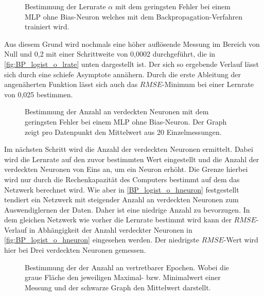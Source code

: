 \begin{figure}[!htb]
    \centering
        
    \caption{Bestimmung der Lernrate $\alpha$ mit dem geringsten Fehler bei einem MLP ohne Bias-Neuron welches mit dem Backpropagation-Verfahren trainiert wird.  }
    \label{fig:BP_logist_o_lrate}
\end{figure}

Aus diesem Grund wird nochmals eine höher auflösende Messung im Bereich von Null und 0,2 mit einer Schrittweite von 0,0002 durchgeführt, die in \autoref{fig:BP_logist_o_lrate} unten dargestellt ist. Der sich so ergebende Verlauf lässt sich durch eine schiefe Asymptote annähern. Durch die erste Ableitung der angenäherten Funktion lässt sich auch das $RMSE$-Minimum bei einer Lernrate von 0,025 bestimmen.\\


\begin{figure}[!htb]
    \centering
        
    \caption{Bestimmung der Anzahl an verdeckten Neuronen mit dem geringsten Fehler bei einem MLP ohne Bias-Neuron. Der Graph zeigt pro Datenpunkt den Mittelwert aus 20 Einzelmessungen.}
    \label{fig:BP_logist_o_hneuron}
\end{figure}

Im nächsten Schritt wird die Anzahl der verdeckten Neuronen ermittelt. Dabei wird die Lernrate auf den zuvor bestimmten Wert eingestellt und die Anzahl der verdeckten Neuronen von Eins an, um ein Neuron erhöht. Die Grenze hierbei wird nur durch die Rechenkapazität des Computers bestimmt auf dem das Netzwerk berechnet wird. Wie aber in \autoref{BP_logist_o_hneuron} festgestellt tendiert ein Netzwerk mit steigender Anzahl an verdeckten Neuronen zum Auswendiglernen der Daten. Daher ist eine niedrige Anzahl zu bevorzugen. In dem gleichen Netzwerk wie vorher die Lernrate bestimmt wird kann der $RMSE$-Verlauf in Abhängigkeit der Anzahl verdeckter Neuronen in \autoref{fig:BP_logist_o_hneuron} eingesehen werden. Der niedrigste $RMSE$-Wert wird hier bei Drei verdeckten Neuronen gemessen.\\ 

\begin{figure}[!htb]
    \centering
        
    \caption{Bestimmung der der Anzahl an vertretbarer Epochen. Wobei die graue Fläche den jeweiligen Maximal- bzw. Minimalwert einer Messung und der schwarze Graph den Mittelwert darstellt.}
    \label{fig:BP_logis_o_epochen}
\end{figure}

